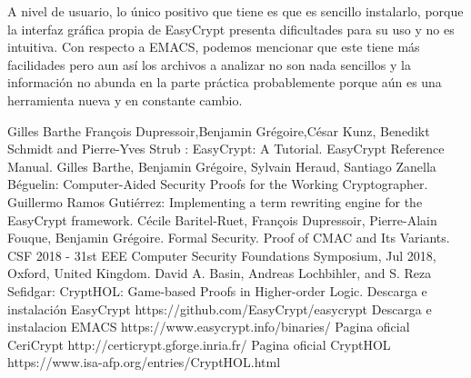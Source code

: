 \documentclass[runningheads,a4paper]{llncs}
\begin{document}
A nivel de usuario, lo único positivo que tiene es que es sencillo instalarlo, porque la interfaz gráfica propia de EasyCrypt presenta dificultades para su uso y no es intuitiva. Con respecto a EMACS, podemos mencionar que este tiene más facilidades pero aun así los archivos a analizar no son nada sencillos y la información no abunda en la parte práctica probablemente porque aún es una herramienta nueva y en constante cambio.



\begin{thebibliography}{1}
Gilles Barthe François Dupressoir,Benjamin Grégoire,César Kunz, Benedikt Schmidt and Pierre-Yves Strub : EasyCrypt: A Tutorial. 
EasyCrypt Reference Manual.
Gilles Barthe, Benjamin Grégoire, Sylvain Heraud, Santiago Zanella Béguelin: Computer-Aided Security Proofs
for the Working Cryptographer.
Guillermo Ramos Gutiérrez: Implementing a term rewriting
engine for the EasyCrypt framework.
Cécile Baritel-Ruet, François Dupressoir, Pierre-Alain Fouque, Benjamin Grégoire. Formal Security.
Proof of CMAC and Its Variants. CSF 2018 - 31st EEE Computer Security Foundations Symposium,
Jul 2018, Oxford, United Kingdom.
David A. Basin, Andreas Lochbihler, and S. Reza Sefidgar: CryptHOL: Game-based Proofs in
Higher-order Logic.
Descarga e instalación EasyCrypt https://github.com/EasyCrypt/easycrypt
Descarga e instalacion EMACS https://www.easycrypt.info/binaries/ 
Pagina oficial CeriCrypt http://certicrypt.gforge.inria.fr/
Pagina oficial CryptHOL https://www.isa-afp.org/entries/CryptHOL.html
\end{thebibliography}
\end{document}
